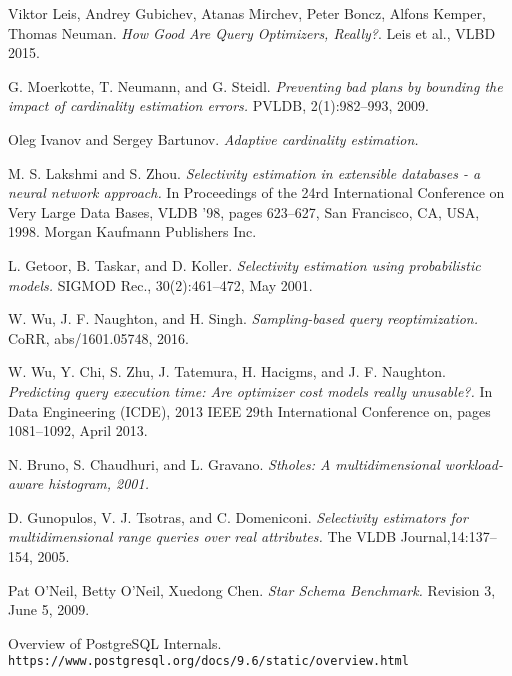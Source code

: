 \renewcommand{\bibname}{REFERENCES}
\begin{thebibliography}{9}
Viktor Leis, Andrey Gubichev, Atanas Mirchev, Peter Boncz, Alfons Kemper, Thomas Neuman.
\textit{How Good Are Query Optimizers, Really?}.
Leis et al., VLBD 2015.

G. Moerkotte, T. Neumann, and G. Steidl.
\textit{Preventing bad plans by bounding the impact of cardinality estimation errors.}
PVLDB, 2(1):982–993, 2009.

Oleg Ivanov and Sergey Bartunov.
\textit{Adaptive cardinality estimation.}

M. S. Lakshmi and S. Zhou.
\textit{Selectivity estimation in extensible databases - a neural network approach.}
In Proceedings of the 24rd International Conference on Very Large Data Bases, VLDB ’98, pages 623–627, San Francisco, CA, USA, 1998. Morgan Kaufmann Publishers Inc.

L. Getoor, B. Taskar, and D. Koller.
\textit{Selectivity estimation using probabilistic models.}
SIGMOD Rec., 30(2):461–472, May 2001.

W. Wu, J. F. Naughton, and H. Singh.
\textit{Sampling-based query reoptimization.}
CoRR, abs/1601.05748, 2016.

W. Wu, Y. Chi, S. Zhu, J. Tatemura, H. Hacigms, and J. F. Naughton.
\textit{Predicting query execution time: Are optimizer cost models really unusable?.}
In Data Engineering (ICDE), 2013 IEEE 29th International Conference on, pages 1081–1092, April 2013.

N. Bruno, S. Chaudhuri, and L. Gravano.
\textit{Stholes: A multidimensional workload-aware histogram, 2001.}

D. Gunopulos, V. J. Tsotras, and C. Domeniconi.
\textit{Selectivity estimators for multidimensional range queries over real attributes.}
The VLDB Journal,14:137–154, 2005.

Pat O'Neil, Betty O'Neil, Xuedong Chen.
\textit{Star Schema Benchmark.}
Revision 3, June 5, 2009.

Overview of PostgreSQL Internals.
\\\texttt{https://www.postgresql.org/docs/9.6/static/overview.html}


\end{thebibliography}
